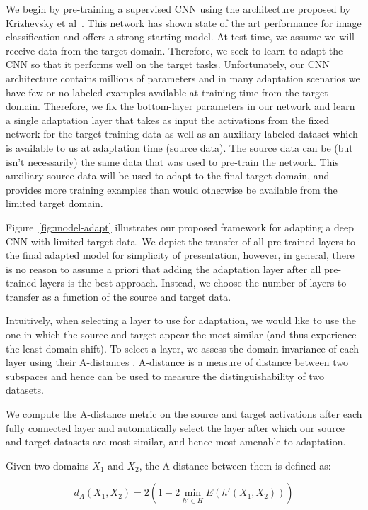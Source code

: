 We begin by pre-training a supervised CNN using the architecture proposed by 
Krizhevsky et al~\cite{supervision}. This network has shown state of the art
performance for image classification and offers a strong starting model.
At test time, we assume we will receive data from the target domain. Therefore, we seek to 
learn to adapt the CNN so that it performs well on the target tasks. Unfortunately,
our CNN architecture contains millions of parameters and in many adaptation 
scenarios we have few or no labeled examples available at training time from the
target domain. Therefore, we fix the bottom-layer parameters in our
network and learn a single adaptation layer that takes as input
the activations from the fixed network for the target training data as well as an auxiliary labeled
dataset which is available to us at adaptation time (source data). The source data
can be (but isn't necessarily) the same data that was used to pre-train the network.
This auxiliary source data will be used to adapt to the final target domain, and
provides more training examples than would otherwise be available from the limited target domain.

Figure~\ref{fig:model-adapt} illustrates our proposed framework for adapting a deep CNN 
with limited target data. We depict the transfer of all pre-trained layers to the final adapted model 
for simplicity of presentation,  however, in general, there is no reason to assume a priori that 
adding the adaptation layer after all pre-trained layers is the best approach.  Instead, we choose
the number of layers to transfer as a function of the source and target data.

Intuitively, when selecting a layer to use for adaptation, we would like to use
the one in which the source and target appear the most similar (and thus
experience the least domain shift).
To select a layer, we assess the domain-invariance of each layer using their A-distances
\cite{adist}. A-distance is a measure of distance between two subspaces and hence 
can be used to measure the distinguishability of two datasets.

We compute the A-distance metric on the source and target activations after each fully 
connected layer
and automatically select the  layer after which
our source and target datasets are most similar, and hence most amenable to adaptation.

Given two domains $X_1$ and $X_2$, the A-distance between them is defined as:

\begin{equation}
  d_A(X_1, X_2) = 2 \left( 1 - 2 \min_{h' \in H} E(h'(X_1, X_2))\right)
\end{equation}


